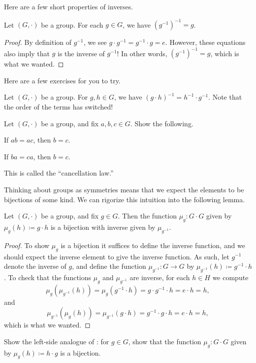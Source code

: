 \documentclass[../main.tex]{subfiles}
\begin{document}
Here are a few short properties of inverses.
\begin{lemma} \label{lem:inv-inv}
    Let $(G,\cdot)$ be a group. For each $g\in G$, we have $\left(g^{-1}\right)^{-1}=g$.
\end{lemma}
\begin{proof}
    By definition of $g^{-1}$, we see $g\cdot g^{-1}=g^{-1}\cdot g=e$. However, these equations also imply that $g$ is the inverse of $g^{-1}$! In other words, $\left(g^{-1}\right)^{-1}=g$, which is what we wanted.
\end{proof}
Here are a few exercises for you to try.
\begin{exe} \label{exe:inverse-prod}
    Let $(G,\cdot)$ be a group. For $g,h\in G$, we have $(g\cdot h)^{-1}=h^{-1}\cdot g^{-1}$. Note that the order of the terms has switched!
\end{exe}
\begin{exe}
    Let $(G,\cdot)$ be a group, and fix $a,b,c\in G$. Show the following.
    \begin{listalph}
        \item If $ab=ac$, then $b=c$.
        \item If $ba=ca$, then $b=c$.
    \end{listalph}
    This is called the ``cancellation law.''
\end{exe}
Thinking about groups as symmetries means that we expect the elements to be bijections of some kind. We can rigorize this intuition into the following lemma.
\begin{proposition} \label{prop:mult-is-bij}
    Let $(G,\cdot)$ be a group, and fix $g\in G$. Then the function $\mu_g\colon G\cdot G$ given by $\mu_g(h)\coloneqq g\cdot h$ is a bijection with inverse given by $\mu_{g^{-1}}$.
\end{proposition}
\begin{proof}
    To show $\mu_g$ is a bijection it suffices to define the inverse function, and we should expect the inverse element to give the inverse function. As such, let $g^{-1}$ denote the inverse of $g$, and define the function $\mu_{g^{-1}}\colon G\to G$ by $\mu_{g^{-1}}(h)\coloneqq g^{-1}\cdot h$. To check that the functions $\mu_g$ and $\mu_{g^{-1}}$ are inverse, for each $h\in H$ we compute
    \[\mu_g\left(\mu_{g^{-1}}(h)\right) = \mu_g\left(g^{-1}\cdot h\right) = g\cdot g^{-1}\cdot h=e\cdot h=h,\]
    and
    \[\mu_{g^{-1}}(\mu_g(h))=\mu_{g^{-1}}(g\cdot h)=g^{-1}\cdot g\cdot h=e\cdot h=h,\]
    which is what we wanted.
\end{proof}
\begin{exe}
    Show the left-side analogue of : for $g\in G$, show that the function $\mu_g\colon G\cdot G$ given by $\mu_g(h)\coloneqq h\cdot g$ is a bijection.
\end{exe}
\end{document}
